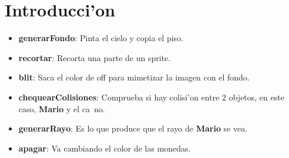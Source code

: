 \section{Introducci'on}

\begin{itemize}
	\item \textbf{generarFondo}: Pinta el cielo y copia el piso.
	\item \textbf{recortar}: Recorta una parte de un sprite.
	\item \textbf{blit}: Saca el color de off para mimetizar la imagen con el fondo.
	\item \textbf{chequearColisiones}: Comprueba si hay colisi'on entre 2 objetos, en este
caso, \textbf{Mario} y el ca~no.
	\item \textbf{generarRayo}: Es lo que produce que el rayo de \textbf{Mario}
se vea.
	\item \textbf{apagar}: Va cambiando el color de las monedas.

\end{itemize}

